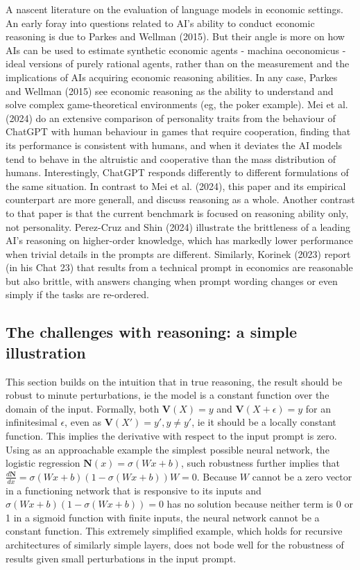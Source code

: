 \documentclass[
]{article}
\theoremstyle{plain}
\theoremstyle{definition}
\theoremstyle{remark}
\begin{document}
A nascent literature on the evaluation of language models in economic
settings. An early foray into questions related to AI's ability to
conduct economic reasoning is due to Parkes and Wellman (2015). But
their angle is more on how AIs can be used to estimate synthetic
economic agents - machina oeconomicus - ideal versions of purely
rational agents, rather than on the measurement and the implications of
AIs acquiring economic reasoning abilities. In any case, Parkes and
Wellman (2015) see economic reasoning as the ability to understand and
solve complex game-theoretical environments (eg, the poker example). Mei
et al. (2024) do an extensive comparison of personality traits from the
behaviour of ChatGPT with human behaviour in games that require
cooperation, finding that its performance is consistent with humans, and
when it deviates the AI models tend to behave in the altruistic and
cooperative than the mass distribution of humans. Interestingly, ChatGPT
responds differently to different formulations of the same situation. In
contrast to Mei et al. (2024), this paper and its empirical counterpart
are more generall, and discuss reasoning as a whole. Another contrast to
that paper is that the current benchmark is focused on reasoning ability
only, not personality. Perez-Cruz and Shin (2024) illustrate the
brittleness of a leading AI's reasoning on higher-order knowledge, which
has markedly lower performance when trivial details in the prompts are
different. Similarly, Korinek (2023) report (in his Chat 23) that
results from a technical prompt in economics are reasonable but also
brittle, with answers changing when prompt wording changes or even
simply if the tasks are re-ordered.

\subsection{The challenges with reasoning: a simple
illustration}\label{the-challenges-with-reasoning-a-simple-illustration}

This section builds on the intuition that in true reasoning, the result
should be robust to minute perturbations, ie the model is a constant
function over the domain of the input. Formally, both
\(\mathbf{V}(X) = y\) and \(\mathbf{V}(X + \epsilon) = y\) for an
infinitesimal \(\epsilon\), even as \(\mathbf{V}(X') = y', y \neq y'\),
ie it should be a locally constant function. This implies the derivative
with respect to the input prompt is zero. Using as an approachable
example the simplest possible neural network, the logistic regression
\(\mathbf{N}(x) = \sigma(Wx + b)\), such robustness further implies that
\(\frac{d\mathbf{N}}{d x} = \sigma(Wx + b)(1-\sigma(Wx + b))W = 0\).
Because \(W\) cannot be a zero vector in a functioning network that is
responsive to its inputs and \(\sigma(Wx + b)(1-\sigma(Wx + b)) = 0\)
has no solution because neither term is 0 or 1 in a sigmoid function
with finite inputs, the neural network cannot be a constant function.
This extremely simplified example, which holds for recursive
architectures of similarly simple layers, does not bode well for the
robustness of results given small perturbations in the input prompt.
\end{document}
